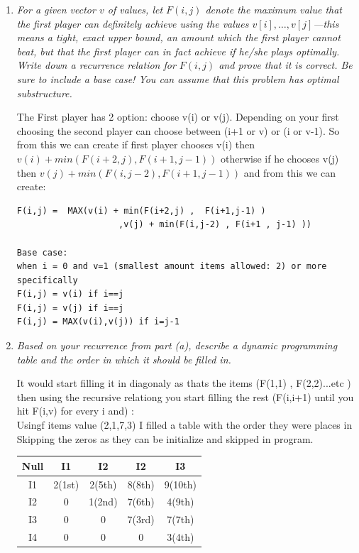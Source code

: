 \documentclass[12pt]{article}
\begin{document}
\begin{enumerate}
	\begin{enumerate}
	\item \textit{For a given vector $v$ of values, let $F(i,j)$ denote the maximum value that the first player can definitely achieve using the values $v[i], \dotsc, v[j]$---this means a \emph{tight}, \emph{exact} upper bound, an amount which the first player cannot beat, but that the first player can in fact achieve if he/she plays optimally. Write down a recurrence relation for $F(i,j)$ and prove that it is correct. Be sure to include a base case!  You can assume that this problem has optimal substructure.}

	The First player has 2 option: choose v(i) or v(j). Depending on your first choosing the second player can choose between (i+1 or v) or (i or v-1). So from this we can create if first player chooses v(i) then $v(i) + min(F(i+2,j) ,  F(i+1,j-1) )$ otherwise  if he chooses v(j) then $v(j) + min(F(i,j-2) , F(i+1 , j-1) )$ and from this we can create:

\begin{small}
\begin{verbatim}
F(i,j) =  MAX(v(i) + min(F(i+2,j) ,  F(i+1,j-1) )
                    ,v(j) + min(F(i,j-2) , F(i+1 , j-1) ))

Base case:
when i = 0 and v=1 (smallest amount items allowed: 2) or more specifically
F(i,j) = v(i) if i==j
F(i,j) = v(j) if i==j
F(i,j) = MAX(v(i),v(j)) if i=j-1
\end{verbatim}
\end{small}


	
	\item \textit{Based on your recurrence from part (a), describe a dynamic programming table and the order in which it should be filled in.}

It would start filling it in diagonaly as thats the items (F(1,1) , F(2,2)...etc ) then using the recursive relationg you start filling the rest (F(i,i+1) until you hit F(i,v) for every i and) :\\
Usingf items value (2,1,7,3) I filled a table with the order they were places in Skipping the zeros as they can be initialize and skipped in program.


\begin{center}
 \begin{tabular}{||c c c c c||} 
 \hline
 Null & I1 & I2 & I2 & I3 \\ [0.5ex] 
 \hline\hline
 I1 & 2(1st) & 2(5th) & 8(8th) & 9(10th) \\ 
 \hline
 I2 & 0 & 1(2nd) & 7(6th) & 4(9th) \\
 \hline
 I3 & 0 & 0 & 7(3rd) & 7(7th) \\
 \hline
 I4 & 0 & 0 & 0 & 3(4th) \\
 \hline


\end{tabular}
\end{center}
\end{enumerate}
\end{enumerate}
\end{document}
